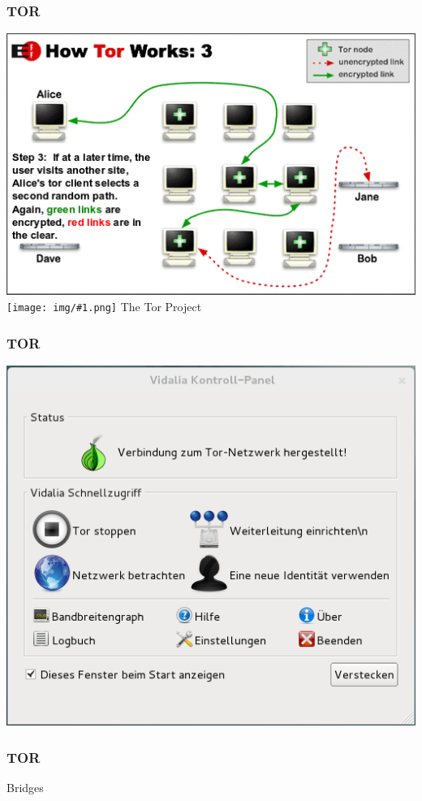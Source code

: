 \documentclass[12pt]{beamer}
\newcommand{\cc}[1]{\texttt{[image: img/\#1.png]}\hspace{1mm}}
\begin{document}
\begin{frame}
    \frametitle{TOR}
    \includegraphics[height=0.7\textheight]{img/tor3.png}
    \\{\small \cc{by} The Tor Project}
\end{frame}

\begin{frame}
    \frametitle{TOR}
    \includegraphics[height=0.7\textheight]{img/vidalia.png}
\end{frame}

\begin{frame}
    \frametitle{TOR}
    \begin{center} \Large Bridges \end{center}
\end{frame}
\end{document}
